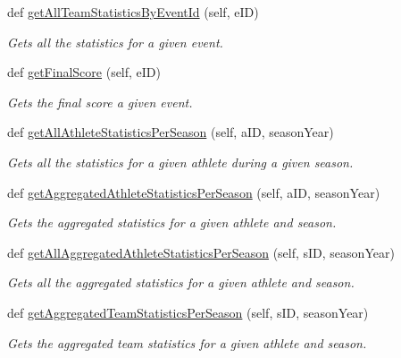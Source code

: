 \begin{DoxyCompactItemize}
def \hyperlink{classhandler_1_1event__result_1_1_event_result_handler_ab895fc012b431f69f4e43f117cc5d516}{get\+All\+Team\+Statistics\+By\+Event\+Id} (self, e\+ID)
\begin{DoxyCompactList}\small\item\em Gets all the statistics for a given event. \end{DoxyCompactList}\item 
def \hyperlink{classhandler_1_1event__result_1_1_event_result_handler_a32a3de5debe160b627747ea12989f32c}{get\+Final\+Score} (self, e\+ID)
\begin{DoxyCompactList}\small\item\em Gets the final score a given event. \end{DoxyCompactList}\item 
def \hyperlink{classhandler_1_1event__result_1_1_event_result_handler_a33321729627e6c89b2fefd9a9f81c5d0}{get\+All\+Athlete\+Statistics\+Per\+Season} (self, a\+ID, season\+Year)
\begin{DoxyCompactList}\small\item\em Gets all the statistics for a given athlete during a given season. \end{DoxyCompactList}\item 
def \hyperlink{classhandler_1_1event__result_1_1_event_result_handler_a946c8456032be93aad1fd2c8e804ebec}{get\+Aggregated\+Athlete\+Statistics\+Per\+Season} (self, a\+ID, season\+Year)
\begin{DoxyCompactList}\small\item\em Gets the aggregated statistics for a given athlete and season. \end{DoxyCompactList}\item 
def \hyperlink{classhandler_1_1event__result_1_1_event_result_handler_ac8edd9568d02ac0db0746a48866fefec}{get\+All\+Aggregated\+Athlete\+Statistics\+Per\+Season} (self, s\+ID, season\+Year)
\begin{DoxyCompactList}\small\item\em Gets all the aggregated statistics for a given athlete and season. \end{DoxyCompactList}\item 
def \hyperlink{classhandler_1_1event__result_1_1_event_result_handler_a1ed778ff72728bee8d68b58dd0b66763}{get\+Aggregated\+Team\+Statistics\+Per\+Season} (self, s\+ID, season\+Year)
\begin{DoxyCompactList}\small\item\em Gets the aggregated team statistics for a given athlete and season. \end{DoxyCompactList}\item 

\end{DoxyCompactItemize}
